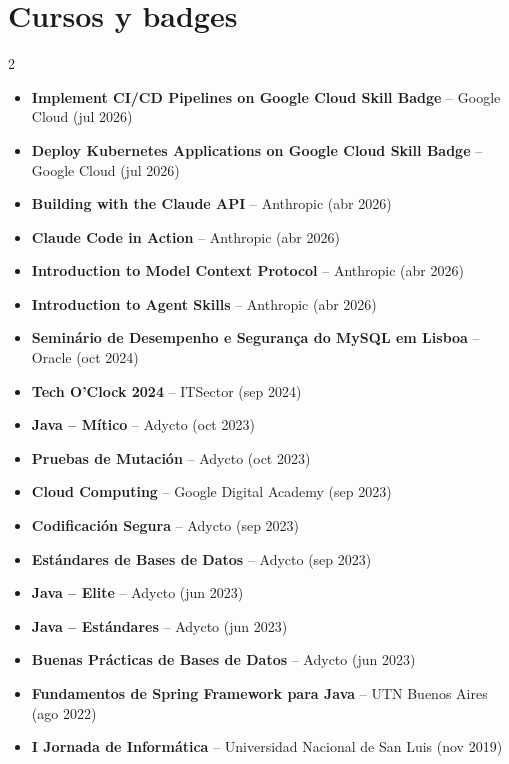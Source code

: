 \documentclass[10pt, a4paper]{article}
\begin{document}
\section{Cursos y badges}
\begin{multicols}{2}
\begin{itemize}[leftmargin=10pt, itemsep=3pt, parsep=0pt, topsep=2pt]
    \item \textbf{Implement CI/CD Pipelines on Google Cloud Skill Badge} -- Google Cloud (jul 2026)
    \item \textbf{Deploy Kubernetes Applications on Google Cloud Skill Badge} -- Google Cloud (jul 2026)
    \item \textbf{Building with the Claude API} -- Anthropic (abr 2026)
    \item \textbf{Claude Code in Action} -- Anthropic (abr 2026)
    \item \textbf{Introduction to Model Context Protocol} -- Anthropic (abr 2026)
    \item \textbf{Introduction to Agent Skills} -- Anthropic (abr 2026)
    \item \textbf{Seminário de Desempenho e Segurança do MySQL em Lisboa} -- Oracle (oct 2024)
    \item \textbf{Tech O'Clock 2024} -- ITSector (sep 2024)
    \item \textbf{Java -- Mítico} -- Adycto (oct 2023)
    \item \textbf{Pruebas de Mutación} -- Adycto (oct 2023)
    \item \textbf{Cloud Computing} -- Google Digital Academy (sep 2023)
    \item \textbf{Codificación Segura} -- Adycto (sep 2023)
    \item \textbf{Estándares de Bases de Datos} -- Adycto (sep 2023)
    \item \textbf{Java -- Elite} -- Adycto (jun 2023)
    \item \textbf{Java -- Estándares} -- Adycto (jun 2023)
    \item \textbf{Buenas Prácticas de Bases de Datos} -- Adycto (jun 2023)
    \item \textbf{Fundamentos de Spring Framework para Java} -- UTN Buenos Aires (ago 2022)
    \item \textbf{I Jornada de Informática} -- Universidad Nacional de San Luis (nov 2019)
\end{itemize}
\end{multicols}

\end{document}
